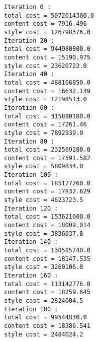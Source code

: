 \documentclass[11pt]{article}
\begin{document}
    \begin{Verbatim}[commandchars=\\\{\}]
Iteration 0 :
total cost = 5072014300.0
content cost = 7916.496
style cost = 126798376.0
Iteration 20 :
total cost = 944980800.0
content cost = 15190.975
style cost = 23620722.0
Iteration 40 :
total cost = 488106850.0
content cost = 16632.139
style cost = 12198513.0
Iteration 60 :
total cost = 315890180.0
content cost = 17261.46
style cost = 7892939.0
Iteration 80 :
total cost = 232569280.0
content cost = 17591.582
style cost = 5809834.0
Iteration 100 :
total cost = 185127260.0
content cost = 17832.629
style cost = 4623723.5
Iteration 120 :
total cost = 153621600.0
content cost = 18009.014
style cost = 3836037.8
Iteration 140 :
total cost = 130585740.0
content cost = 18147.535
style cost = 3260106.8
Iteration 160 :
total cost = 113142776.0
content cost = 18259.645
style cost = 2824004.5
Iteration 180 :
total cost = 99544830.0
content cost = 18386.541
style cost = 2484024.2

    \end{Verbatim}
\end{document}
